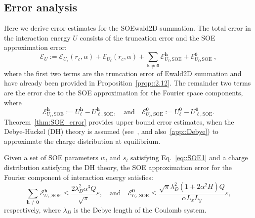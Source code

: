 \subsection{Error analysis}\label{subsec::errSOEwald2D}
Here we derive error estimates for the SOEwald2D summation. 
The total error in the interaction energy $U$ consists of the truncation error and the SOE approximation error:
\begin{equation}
	\mathscr{E}_{U} := \mathscr{E}_{U_{s}}(r_c, \alpha) + \mathscr{E}_{U_{\ell}}(r_c, \alpha) + \sum_{\bm{k}\neq\bm{0}}\mathscr{E}_{U_{\ell},\text{SOE}}^{ \bm{h}} + \mathscr{E}_{U_{\ell},\text{SOE}}^{\bm{0}}\;,
\end{equation}
where the first two terms are the truncation error of Ewald2D summation and have already been provided in Proposition~\ref{prop::2.12}. 
The remainder two terms are the error due to the SOE approximation for the Fourier space components, where
\begin{equation}
	\mathscr{E}_{U_{\ell},\text{SOE}}^{\bm{h}}:=U_{\ell}^{\bm{h}}-U_{\ell,\text{SOE}}^{\bm{h}},\quad \text{and}\quad \mathscr{E}_{U_{\ell},\text{SOE}}^{\bm{0}}:=U_{\ell}^{\bm{0}}- U_{\ell,\text{SOE}}^{\bm{0}}.
\end{equation}
Theorem~\ref{thm:SOE_error} provides  upper bound error estimates, when the Debye-H$\ddot{\text{u}}$ckel (DH) theory is assumed (see~\cite{levin2002electrostatic}, and also~\ref{app::Debye}) to approximate the charge distribution at equilibrium.

\begin{thm}
	\label{thm:SOE_error}
	Given a set of SOE parameters $w_l$ and $s_l$ satisfying Eq.~\eqref{eq::SOE1} and a charge distribution satisfying the DH theory, the SOE approximation error for the Fourier component of interaction energy satisfies:
	\begin{equation}\sum_{\bm{h}\neq\bm{0}}\mathscr{E}_{U_{\ell},\text{SOE}}^{\bm{h}} \leq \frac{2 \lambda_D^2 \alpha^3Q}{\sqrt{\pi}}\varepsilon,
		\quad \text{and} \quad
		\mathscr{E}_{U_{\ell},\text{SOE}}^{\bm{0}} \leq \frac{\sqrt{\pi} \lambda_D^2 (1+2\alpha^2H)Q}{\alpha L_xL_y}\varepsilon,
		\label{eq::51}
	\end{equation}
	respectively, where $\lambda_D$ is the Debye length of the Coulomb system. 
\end{thm}

